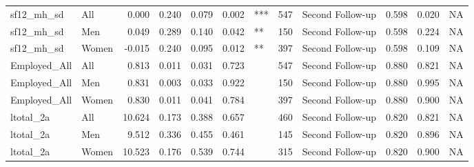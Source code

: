 \begin{table}
\begin{tabular}[t]{llrrrrlrlrrr}
sf12\_mh\_sd & All & 0.000 & 0.240 & 0.079 & 0.002 & *** & 547 & Second Follow-up & 0.598 & 0.020 & NA\\
sf12\_mh\_sd & Men & 0.049 & 0.289 & 0.140 & 0.042 & ** & 150 & Second Follow-up & 0.598 & 0.224 & NA\\
sf12\_mh\_sd & Women & -0.015 & 0.240 & 0.095 & 0.012 & ** & 397 & Second Follow-up & 0.598 & 0.109 & NA\\
Employed\_All & All & 0.813 & 0.011 & 0.031 & 0.723 &  & 547 & Second Follow-up & 0.880 & 0.821 & NA\\
Employed\_All & Men & 0.831 & 0.003 & 0.033 & 0.922 &  & 150 & Second Follow-up & 0.880 & 0.995 & NA\\
\addlinespace
Employed\_All & Women & 0.830 & 0.011 & 0.041 & 0.784 &  & 397 & Second Follow-up & 0.880 & 0.900 & NA\\
ltotal\_2a & All & 10.624 & 0.173 & 0.388 & 0.657 &  & 460 & Second Follow-up & 0.820 & 0.821 & NA\\
ltotal\_2a & Men & 9.512 & 0.336 & 0.455 & 0.461 &  & 145 & Second Follow-up & 0.820 & 0.896 & NA\\
ltotal\_2a & Women & 10.523 & 0.176 & 0.539 & 0.744 &  & 315 & Second Follow-up & 0.820 & 0.900 & NA\\
\bottomrule
\end{tabular}
\end{table}
